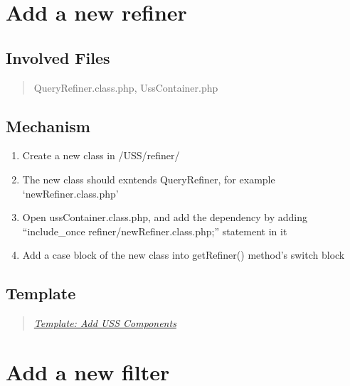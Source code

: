 \documentclass[letterpaper,10pt,english]{sphinxmanual}
\begin{document}
\section{Add a new refiner}
\label{docs/hooks/new_refiner:add-a-new-refiner}\label{docs/hooks/new_refiner::doc}\label{docs/hooks/new_refiner:hook-refiner}

\subsection{Involved Files}
\label{docs/hooks/new_refiner:involved-files}\begin{quote}

QueryRefiner.class.php, UssContainer.php
\end{quote}


\subsection{Mechanism}
\label{docs/hooks/new_refiner:mechanism}\begin{enumerate}
\item {} 
Create a new class in /USS/refiner/

\item {} 
The new class should exntends QueryRefiner, for example `newRefiner.class.php'

\item {} 
Open ussContainer.class.php, and add the dependency by adding ``include\_once refiner/newRefiner.class.php;'' statement in it

\item {} 
Add a case block of the new class into getRefiner() method's switch block

\end{enumerate}


\subsection{Template}
\label{docs/hooks/new_refiner:template}\begin{quote}

{\hyperref[docs/hooks/t_uss_components:hook-template-uss]{\emph{Template: Add USS Components}}}
\end{quote}


\section{Add a new filter}
\label{docs/hooks/new_filter:hook-filter}\label{docs/hooks/new_filter::doc}\label{docs/hooks/new_filter:add-a-new-filter}
\end{document}
